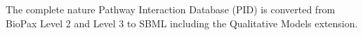 \documentclass{bioinfo}
\begin{document}
\begin{methods}
%
The complete nature Pathway Interaction Database (PID) is converted from BioPax Level 2 and Level 3 to SBML including the Qualitative Models extension.


\end{methods}
\end{document}
